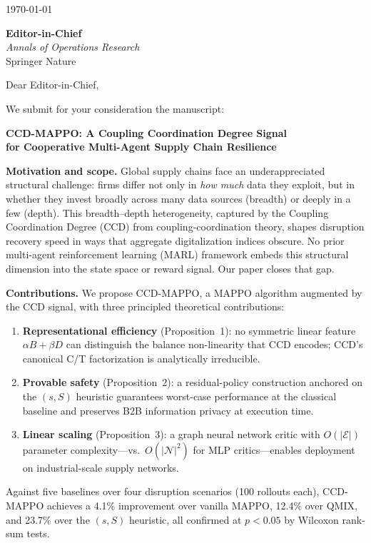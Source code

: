 \documentclass[11pt,a4paper]{article}
\begin{document}
\today

\bigskip

\textbf{Editor-in-Chief}\\
\textit{Annals of Operations Research}\\
Springer Nature

\bigskip\bigskip

Dear Editor-in-Chief,

We submit for your consideration the manuscript:

\begin{center}
\textbf{CCD-MAPPO: A Coupling Coordination Degree Signal\\
for Cooperative Multi-Agent Supply Chain Resilience}
\end{center}

\textbf{Motivation and scope.}
Global supply chains face an underappreciated structural challenge: firms differ not only
in \emph{how much} data they exploit, but in whether they invest broadly across many
data sources (breadth) or deeply in a few (depth).  This breadth--depth heterogeneity,
captured by the Coupling Coordination Degree (CCD) from coupling-coordination theory,
shapes disruption recovery speed in ways that aggregate digitalization indices obscure.
No prior multi-agent reinforcement learning (MARL) framework embeds this structural
dimension into the state space or reward signal.  Our paper closes that gap.

\textbf{Contributions.}
We propose CCD-MAPPO, a MAPPO algorithm augmented by the CCD signal, with three
principled theoretical contributions:
\begin{enumerate}
  \item \textbf{Representational efficiency} (Proposition~1): no symmetric linear
    feature $\alpha B + \beta D$ can distinguish the balance non-linearity that CCD
    encodes; CCD's canonical C/T factorization is analytically irreducible.
  \item \textbf{Provable safety} (Proposition~2): a residual-policy construction
    anchored on the $(s,S)$ heuristic guarantees worst-case performance at the
    classical baseline and preserves B2B information privacy at execution time.
  \item \textbf{Linear scaling} (Proposition~3): a graph neural network critic with
    $O(|\mathcal{E}|)$ parameter complexity---vs.\ $O(|\mathcal{N}|^2)$ for MLP
    critics---enables deployment on industrial-scale supply networks.
\end{enumerate}
Against five baselines over four disruption scenarios (100 rollouts each), CCD-MAPPO
achieves a 4.1\% improvement over vanilla MAPPO, 12.4\% over QMIX, and 23.7\% over
the $(s,S)$ heuristic, all confirmed at $p<0.05$ by Wilcoxon rank-sum tests.
\end{document}
